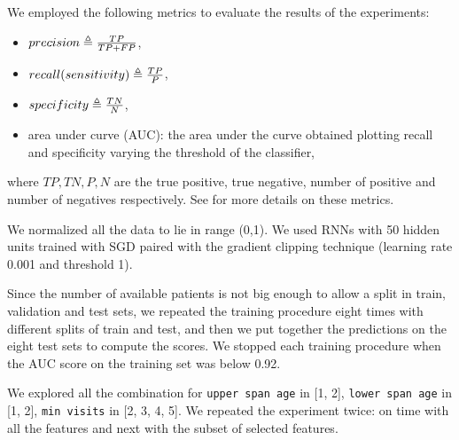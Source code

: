 We employed the following metrics to evaluate the results of the experiments:
\begin{itemize}
	\item $precision \triangleq \frac{TP}{TP+FP}$,
	\item $recall(sensitivity) \triangleq \frac{TP}{P}$,
	\item $specificity \triangleq 	\frac{TN}{N}$,
	\item area under curve (AUC): the area under the curve obtained plotting recall and specificity varying the threshold of the classifier,
\end{itemize}
where $TP, TN, P, N$ are the true positive, true negative, number of positive and number of negatives respectively. See \cite{RocMetrics} for more details on these metrics.

We normalized all the data to lie in range (0,1). 
We used RNNs with 50 hidden units trained with SGD paired with the gradient clipping technique (learning rate 0.001 and threshold 1).

Since the number of available patients is not big enough to allow a split in train, validation and test sets, we repeated the training procedure eight times with different splits of train and test, and then we put together the predictions on the eight test sets to compute the scores. We stopped each training procedure when the AUC score on the training set was below 0.92.
 
We explored all the combination for \texttt{upper span age} in [1, 2], \texttt{lower span age} in [1, 2], \texttt{min visits} in [2, 3, 4, 5].  We repeated the experiment twice: on time with all the features and next with the subset of selected features.




